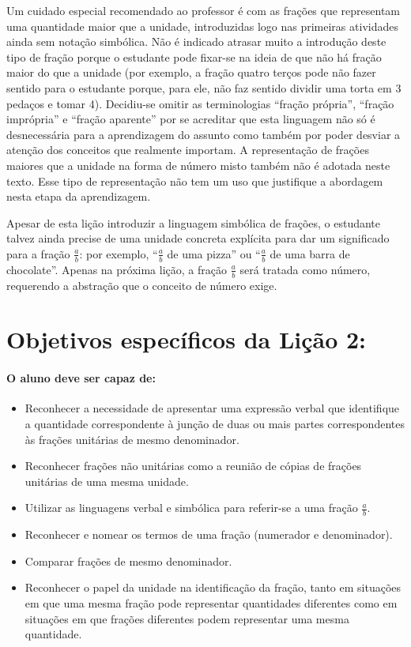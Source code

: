 Um cuidado especial recomendado ao professor é com as frações que representam uma quantidade maior que a unidade, introduzidas logo nas primeiras atividades ainda sem notação simbólica. Não é indicado atrasar muito a introdução deste tipo de fração porque o estudante pode fixar-se na ideia de que não há fração maior do que a unidade  (por exemplo, a fração quatro terços pode não fazer sentido para o estudante porque, para ele, não faz sentido dividir uma torta em 3 pedaços e tomar 4). Decidiu-se omitir as terminologias ``fração própria'', ``fração imprópria'' e ``fração aparente'' por se acreditar que esta linguagem não só é desnecessária para a aprendizagem do assunto como também por poder desviar a atenção dos conceitos que realmente importam.
A representação de frações maiores que a unidade na forma de número misto também não é adotada neste texto. Esse tipo de representação não tem um uso que justifique a abordagem nesta etapa da aprendizagem.

Apesar de esta lição introduzir a linguagem simbólica de frações, o estudante talvez ainda precise de uma unidade concreta explícita para dar um significado para a fração $\frac{a}{b}$: por exemplo, ``$\frac{a}{b}$ de uma pizza'' ou ``$\frac{a}{b}$ de uma barra de chocolate''. Apenas na próxima lição, a fração $\frac{a}{b}$ será tratada como número, requerendo a abstração que o conceito de número exige.
\vspace{.15cm}

\section{Objetivos específicos da Lição 2:}

\paragraph{O aluno deve ser capaz de:}
\begin{itemize}
 \item  Reconhecer a necessidade de apresentar uma expressão verbal que identifique a quantidade correspondente à junção de duas ou mais partes correspondentes às frações unitárias de mesmo denominador.
 \item  Reconhecer frações não unitárias como a reunião de cópias de frações unitárias de uma mesma unidade. 
 \item  Utilizar as linguagens verbal e simbólica para referir-se a uma fração $\frac{a}{b}$.
 \item  Reconhecer e nomear os termos de uma fração (numerador e denominador). 
 \item  Comparar frações de mesmo denominador.
 \item Reconhecer o papel da unidade na identificação da fração, tanto em situações em  que uma mesma fração pode representar quantidades diferentes como em situações em que frações diferentes podem representar uma mesma quantidade.
\end{itemize}
\clearpage


